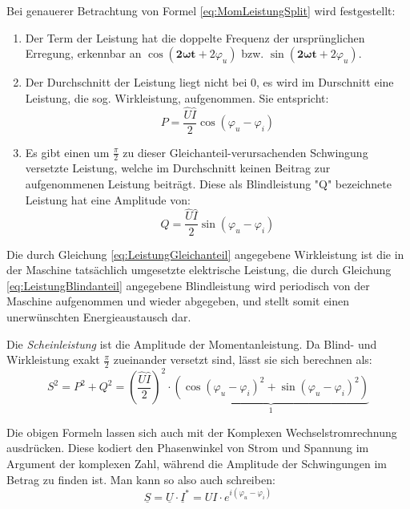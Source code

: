 Bei genauerer Betrachtung von Formel \eqref{eq:MomLeistungSplit} wird festgestellt:
\begin{enumerate}
\item Der Term der Leistung hat die doppelte Frequenz der ursprünglichen Erregung, erkennbar an $\cos(\mathbf{2\omega t} + 2\varphi_u)$ bzw. $\sin(\mathbf{2\omega t} + 2\varphi_u)$.

\item Der Durchschnitt der Leistung liegt nicht bei 0, es wird im Durschnitt eine Leistung, die sog. Wirkleistung, aufgenommen. Sie entspricht:
\begin{equation}
P = \frac{\hat{U}\hat{I}}{2}\cos(\varphi_u-\varphi_i) \label{eq:LeistungGleichanteil}
\end{equation}

\item Es gibt einen um $\frac{\pi}{2}$ zu dieser Gleichanteil-verursachenden Schwingung versetzte Leistung, welche im Durchschnitt keinen Beitrag zur aufgenommenen Leistung beiträgt. Diese als Blindleistung "Q" bezeichnete Leistung hat eine Amplitude von:
\begin{equation}
Q = \frac{\hat{U}\hat{I}}{2}\sin(\varphi_u - \varphi_i) \label{eq:LeistungBlindanteil}
\end{equation}
\end{enumerate}

Die durch Gleichung \eqref{eq:LeistungGleichanteil} angegebene Wirkleistung ist die in der Maschine tatsächlich umgesetzte elektrische Leistung, die durch Gleichung \eqref{eq:LeistungBlindanteil} angegebene Blindleistung wird periodisch von der Maschine aufgenommen und wieder abgegeben, und stellt somit einen unerwünschten Energieaustausch dar.

Die \textit{Scheinleistung} ist die Amplitude der Momentanleistung. Da Blind- und Wirkleistung exakt $\frac{\pi}{2}$ zueinander versetzt sind, lässt sie sich berechnen als:
\begin{equation}
S^2=P^2 + Q^2 = \left(\frac{\hat{U}\hat{I}}{2}\right)^2\cdot \underbrace{(\cos(\varphi_u - \varphi_i)^2 + \sin(\varphi_u - \varphi_i)^2)}_{1}
\end{equation}

Die obigen Formeln lassen sich auch mit der Komplexen Wechselstromrechnung ausdrücken. Diese kodiert den Phasenwinkel von Strom und Spannung im Argument der komplexen Zahl, während die Amplitude der Schwingungen im Betrag zu finden ist. Man kann so also auch schreiben:
\begin{equation}
\underline{S} = \underline{U}\cdot\underline{I}^* = UI\cdot e^{i(\varphi_u-\varphi_i)} \label{eq:KomplexS}
\end{equation}

